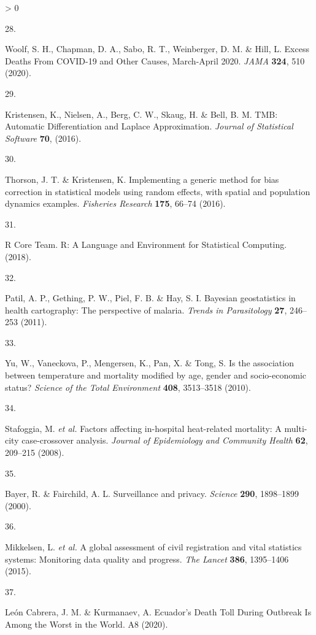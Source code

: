\documentclass[
]{article}
\newlength{\cslhangindent}
\newlength{\csllabelwidth}
\newenvironment{CSLReferences}[2] %
 {%
  \setlength{\parindent}{0pt}
  \ifodd #1 \everypar{\setlength{\hangindent}{\cslhangindent}}\ignorespaces\fi
  \ifnum #2 > 0
  \setlength{\parskip}{#2\baselineskip}
  \fi
 }%
 {}
\newcommand{\CSLLeftMargin}[1]{\parbox[t]{\csllabelwidth}{#1}}
\newcommand{\CSLRightInline}[1]{\parbox[t]{\linewidth - \csllabelwidth}{#1}\break}
\begin{document}
\begin{CSLReferences}{0}{0}
\leavevmode\hypertarget{ref-Woolf2020}{}%
\CSLLeftMargin{28. }
\CSLRightInline{Woolf, S. H., Chapman, D. A., Sabo, R. T., Weinberger, D. M. \& Hill, L. {Excess Deaths From COVID-19 and Other Causes, March-April 2020}. \emph{JAMA} \textbf{324}, 510 (2020).}

\leavevmode\hypertarget{ref-Kristensen2016}{}%
\CSLLeftMargin{29. }
\CSLRightInline{Kristensen, K., Nielsen, A., Berg, C. W., Skaug, H. \& Bell, B. M. {TMB: Automatic Differentiation and Laplace Approximation}. \emph{Journal of Statistical Software} \textbf{70}, (2016).}

\leavevmode\hypertarget{ref-Thorson2016}{}%
\CSLLeftMargin{30. }
\CSLRightInline{Thorson, J. T. \& Kristensen, K. {Implementing a generic method for bias correction in statistical models using random effects, with spatial and population dynamics examples}. \emph{Fisheries Research} \textbf{175}, 66--74 (2016).}

\leavevmode\hypertarget{ref-RCoreTeam2018}{}%
\CSLLeftMargin{31. }
\CSLRightInline{R Core Team. {R: A Language and Environment for Statistical Computing}. (2018).}

\leavevmode\hypertarget{ref-Patil2011}{}%
\CSLLeftMargin{32. }
\CSLRightInline{Patil, A. P., Gething, P. W., Piel, F. B. \& Hay, S. I. {Bayesian geostatistics in health cartography: The perspective of malaria}. \emph{Trends in Parasitology} \textbf{27}, 246--253 (2011).}

\leavevmode\hypertarget{ref-Yu2010}{}%
\CSLLeftMargin{33. }
\CSLRightInline{Yu, W., Vaneckova, P., Mengersen, K., Pan, X. \& Tong, S. {Is the association between temperature and mortality modified by age, gender and socio-economic status?} \emph{Science of the Total Environment} \textbf{408}, 3513--3518 (2010).}

\leavevmode\hypertarget{ref-Stafoggia2008}{}%
\CSLLeftMargin{34. }
\CSLRightInline{Stafoggia, M. \emph{et al.} {Factors affecting in-hospital heat-related mortality: A multi-city case-crossover analysis}. \emph{Journal of Epidemiology and Community Health} \textbf{62}, 209--215 (2008).}

\leavevmode\hypertarget{ref-Bayer2000}{}%
\CSLLeftMargin{35. }
\CSLRightInline{Bayer, R. \& Fairchild, A. L. {Surveillance and privacy}. \emph{Science} \textbf{290}, 1898--1899 (2000).}

\leavevmode\hypertarget{ref-Mikkelsen2015}{}%
\CSLLeftMargin{36. }
\CSLRightInline{Mikkelsen, L. \emph{et al.} {A global assessment of civil registration and vital statistics systems: Monitoring data quality and progress}. \emph{The Lancet} \textbf{386}, 1395--1406 (2015).}

\leavevmode\hypertarget{ref-LeonCabrera2020}{}%
\CSLLeftMargin{37. }
\CSLRightInline{León Cabrera, J. M. \& Kurmanaev, A. {Ecuador's Death Toll During Outbreak Is Among the Worst in the World}. A8 (2020).}

\end{CSLReferences}
\end{document}
